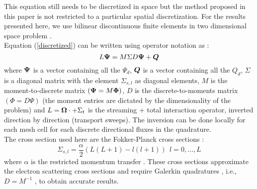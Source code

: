 This equation still needs to be discretized in space but the method proposed
in this paper is not restricted to a particular spatial discretization. For
the results presented here, we use bilinear discontinuous finite elements in
two dimensional space problem \cite{dgfem}.\\ 
Equation (\ref{discretized}) can be written using operator notation as :
\begin{equation}
L \boldsymbol{\Psi} = M\Sigma D \boldsymbol{\Psi} + \boldsymbol{Q}
\label{operator}
\end{equation}
where $\boldsymbol{\Psi}$ is a vector containing all the $\Psi_d$, $\boldsymbol{Q}$ is a
vector containing all the $Q_d$, $\Sigma$ is a diagonal matrix with the
element $\Sigma_{s,l}$ as diagonal elements, $M$ is the moment-to-discrete
matrix $(\boldsymbol{\Psi} = M\boldsymbol{\Phi})$, $D$ is the discrete-to-moments matrix
$(\Phi=D\Psi)$ (the moment entries are dictated  by the dimensionality of the
problem) and $L = \boldsymbol{\Omega}\cdot + \Sigma_t$ is the streaming + total interaction operator,
inverted direction by direction (transport sweeps). The inversion can be done
locally for each mesh cell for each discrete directional fluxes in the
quadrature.\\
The cross section used here are the Fokker-Planck cross sections :
\begin{equation}
\Sigma_{s,l}=\frac{\alpha}{2} (L(L+1)-l(l+1))\ \ l=0,\hdots,L
\end{equation}
where $\alpha$ is the restricted momentum transfer \cite{morel_96}.
These cross sections approximate the electron scattering cross sections
\cite{morel_81} and require Galerkin quadratures , i.e.,
$D=M^{-1}$ \cite{graal}, to obtain accurate results.
